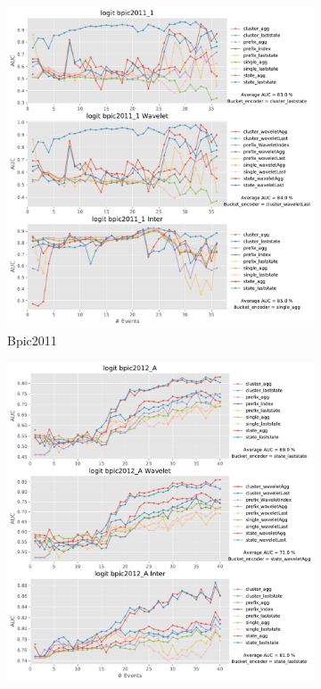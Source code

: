 \documentclass[twoside,11pt]{Latex/Classes/PhDthesisPSnPDF}
\begin{document}
\begin{figure}[!htbp]
\begin{subfigure}{0.48\textwidth}
		\includegraphics[width=\linewidth]{images/inter/logit/bpic2011_1.pdf}
		\caption{Bpic2011} \label{fig:b11i}
	\end{subfigure}	
	\medskip
	\begin{subfigure}{0.48\textwidth}
		\includegraphics[width=\linewidth]{images/inter/logit/bpic2012_A.pdf}

\end{subfigure}
\end{figure}
\end{document}
